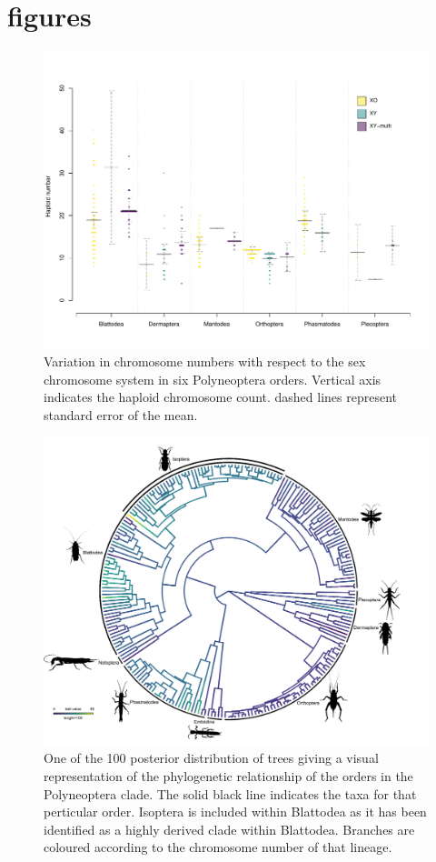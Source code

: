 \section{figures}%

\begin{figure}[h]
\centering \includegraphics[width=.7\textwidth]{figures/Preliminary_data.pdf}
\caption{
Variation in chromosome numbers with respect to the sex chromosome system in six Polyneoptera orders. Vertical axis indicates the haploid chromosome count. dashed lines represent standard error of the mean.
}
\label{fig:order.plots}
\end{figure}

\newpage
\begin{figure}[h]
\centering \includegraphics[width=1\textwidth]{figures/phylogenetic_tree.pdf}
\caption{
One of the 100 posterior distribution of trees giving a visual representation of the phylogenetic relationship of the orders in the Polyneoptera clade. The solid black line indicates the taxa for that perticular order. Isoptera is included within Blattodea as it has been identified as a highly derived clade within Blattodea. Branches are coloured according to the chromosome number of that lineage. 
}
\label{fig:phyloplot}
\end{figure}

